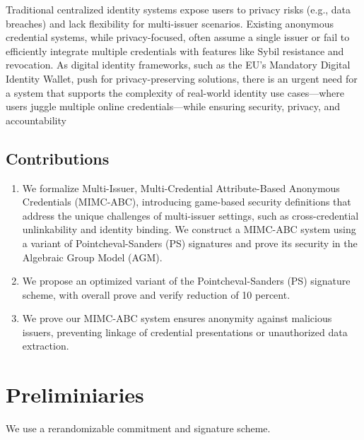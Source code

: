 Traditional centralized identity systems expose users to privacy risks (e.g., data breaches) and lack flexibility for multi-issuer scenarios. Existing anonymous credential systems, while privacy-focused, often assume a single issuer or fail to efficiently integrate multiple credentials with features like Sybil resistance and revocation. As digital identity frameworks, such as the EU’s Mandatory Digital Identity Wallet, push for privacy-preserving solutions, there is an urgent need for a system that supports the complexity of real-world identity use cases—where users juggle multiple online credentials—while ensuring security, privacy, and accountability


\subsection{Contributions}

\begin{enumerate}
    \item We formalize Multi-Issuer, Multi-Credential Attribute-Based Anonymous Credentials (MIMC-ABC), introducing game-based security definitions that address the unique challenges of multi-issuer settings, such as cross-credential unlinkability and identity binding. We construct a MIMC-ABC system using a variant of Pointcheval-Sanders (PS) signatures and prove its security in the Algebraic Group Model (AGM).

    \item We propose an optimized variant of the Pointcheval-Sanders (PS) signature scheme, with overall prove and verify reduction of 10 percent. 

    \item   We prove our MIMC-ABC system ensures anonymity against malicious issuers, preventing linkage of credential presentations or unauthorized data extraction.
\end{enumerate}







\section{Preliminiaries}
We use a rerandomizable commitment and signature scheme. 

